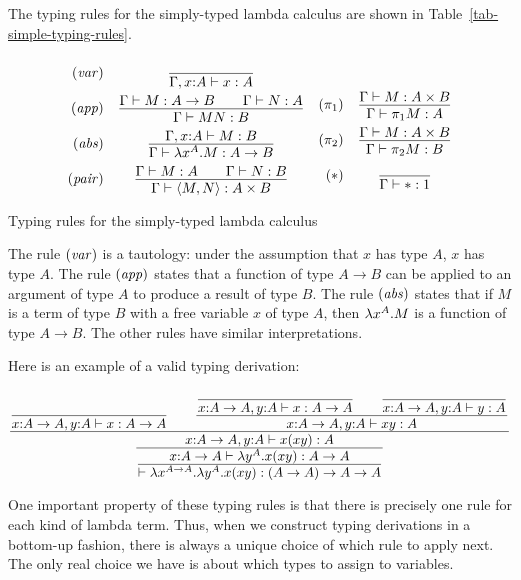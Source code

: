 \documentclass{article}
\begin{document}
The typing rules for the simply-typed lambda calculus are shown in
Table~\ref{tab-simple-typing-rules}.
\begin{table*}[tbp]
\[
\begin{array}{rc}
        \tjvar
&       \deriv{}{\Gamma,\typ{x}{ A}\tj x: A}
\nl     \tjapp
&       \deriv{\Gamma\tj M: A\to B\sep\Gamma\tj N: A}
                {\Gamma\tj MN: B}
\nl     \tjlam
&       \deriv{\Gamma,\typ{x}{ A}\tj M: B}
                {\Gamma\tj\lamabs{x}{A}.M: A\to B}
\nl     \tjpair
&       \deriv{\Gamma\tj M: A\sep\Gamma\tj N: B}
                {\Gamma\tj\pair{M,N}: A\times B}
\end{array}
\begin{array}{rc}
\nl     \tjproja
&       \deriv{\Gamma\tj M: A\times B}{\Gamma\tj\proj1 M: A}
\nl     \tjprojb
&       \deriv{\Gamma\tj M: A\times B}{\Gamma\tj\proj2 M: B}
\nl     \tjunit
&       \deriv{}{\Gamma\tj\unit:1}
\end{array}
\]
\caption{Typing rules for the simply-typed lambda calculus}
\label{tab-simple-typing-rules}
\end{table*}
The rule $\textrm{(\textit{var\/})}$ is a tautology: under the assumption that $x$ has
type $A$, $x$ has type $A$. The rule $\textrm{(\textit{app\/})}$ states that a function
of type $A\to B$ can be applied to an argument of type $A$ to produce
a result of type $B$. The rule $\textrm{(\textit{abs\/})}$ states that if $M$ is a term
of type $B$ with a free variable $x$ of type $A$, then
$\lambda x^{A}.M$ is a function of type $A\to B$. The other rules
have similar interpretations.

Here is an example of a valid typing derivation:
{
\footnotesize
\[
\deriv{
  \deriv{
    }{
    \typ{x}{A\to A},\typ{y}{A}\tj x:A\to A
    }
  \sep
  \deriv{
    \deriv{
      }{
      \typ{x}{A\to A},\typ{y}{A}\tj x:A\to A
      }
    \sep
    \deriv{
      }{
      \typ{x}{A\to A},\typ{y}{A}\tj y:A
      }
    }{
    \typ{x}{A\to A},\typ{y}{A}\tj xy:A
    }
  }{
  \deriv{
    \typ{x}{A\to A},\typ{y}{A}\tj x(xy):A
    }{
    \deriv{
      \typ{x}{A\to A}\tj\lamabs{y}{A}.x(xy):A\to A
      }{
      \tj\lamabs{x}{A\to A}.\lamabs{y}{A}.x(xy):(A\to A)\to A\to A
      }
    }
  }
\]
}

One important property of these typing rules is that there is
precisely one rule for each kind of lambda term. Thus, when we
construct typing derivations in a bottom-up fashion, there is always a
unique choice of which rule to apply next. The only real choice we
have is about which types to assign to variables. 
\end{document}
